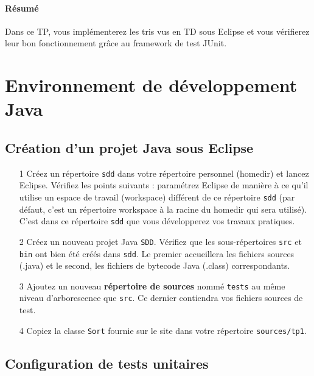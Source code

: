 \documentclass[iutinfo, a4paper, nocorrection, 10pt]{ustl-tdtp}
\date{\annee{2018}--\annee{2019}}
\begin{document}
\maketitle
\thispagestyle{empty}

\paragraph{Résumé} Dans ce TP, vous implémenterez les tris vus en TD sous Eclipse et vous vérifierez leur bon fonctionnement grâce au framework de test JUnit.

\section{Environnement de développement Java}


\subsection{Création d'un projet Java sous Eclipse}
\begin{itemize}
\item[1] Créez un répertoire \texttt{sdd} dans votre répertoire personnel (homedir) et lancez Eclipse. Vérifiez les points suivants :
paramétrez Eclipse de manière à ce qu'il utilise un espace de travail (workspace) différent de ce répertoire \texttt{sdd} (par défaut, c'est un répertoire workspace à la racine du homedir qui sera utilisé). C'est dans ce répertoire \texttt{sdd} que vous développerez vos travaux pratiques. 
\item[2] Créez un nouveau projet Java \texttt{SDD}. Vérifiez que les sous-répertoires \texttt{src} et \texttt{bin} ont bien été créés dans \texttt{sdd}. Le premier accueillera les fichiers sources (.java) et le second, les fichiers de bytecode Java (.class) correspondants.
\item[3] Ajoutez un nouveau \textbf{répertoire de sources} nommé \texttt{tests} au même niveau d’arborescence que \texttt{src}. Ce dernier contiendra vos fichiers sources de test.
\item[4] Copiez la classe \texttt{Sort} fournie sur le site dans votre répertoire \texttt{sources/tp1}.
\end{itemize}

\subsection{Configuration de tests unitaires}
\end{document}
